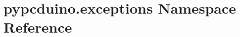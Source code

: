 \hypertarget{namespacepypcduino_1_1exceptions}{\section{pypcduino.\-exceptions Namespace Reference}
\label{namespacepypcduino_1_1exceptions}
}
